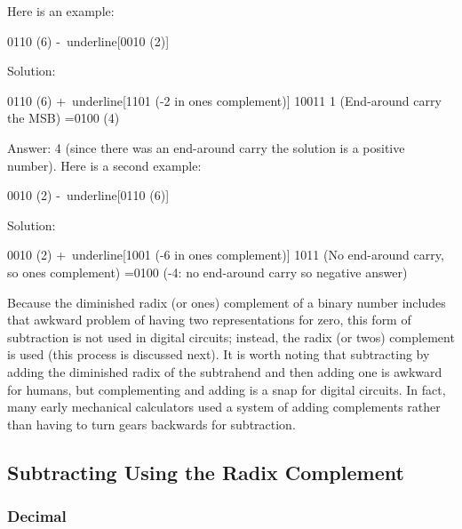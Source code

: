 Here is an example:

\begin{binDisp}[commandchars=~\[\]]
      0110  (6)
     -~underline[0010  (2)]
\end{binDisp}

Solution:

\begin{binDisp}[commandchars=~\[\]]
      0110  (6)
     +~underline[1101  (-2 in ones complement)]
     10011
         1  (End-around carry the MSB)
     =0100  (4)
\end{binDisp}

Answer: 4 (since there was an end-around carry the solution is a positive number). Here is a second example:

\begin{binDisp}[commandchars=~\[\], samepage=true]
      0010  (2)
     -~underline[0110  (6)]
\end{binDisp}

Solution:

\begin{binDisp}[commandchars=~\[\], samepage=true]
      0010  (2)
     +~underline[1001  (-6 in ones complement)]
      1011  (No end-around carry, so ones complement)
     =0100  (-4: no end-around carry so negative answer)
\end{binDisp}

Because the diminished radix (or ones) complement of a binary number includes that awkward problem of having two representations for zero, this form of subtraction is not used in digital circuits; instead, the radix (or twos) complement is used (this process is discussed next). It is worth noting that subtracting by adding the diminished radix of the subtrahend and then adding one is awkward for humans, but complementing and adding is a snap for digital circuits. In fact, many early mechanical calculators used a system of adding complements rather than having to turn gears backwards for subtraction. 

\subsection{Subtracting Using the Radix Complement}
\label{MO:sub:subtracting_using_radix_complement}

\subsubsection{Decimal}
\label{MO:subsub:decimal_subtraction_with_radix_complement}

